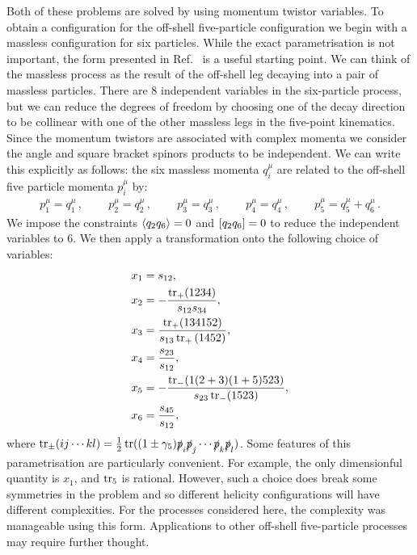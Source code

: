 \documentclass[main.tex]{subfiles}
\begin{document}
Both of these problems are solved by using momentum twistor variables. To obtain a configuration for the off-shell five-particle configuration we begin with a massless configuration for six particles. While the exact parametrisation is not important, the form presented in Ref.~\cite{Badger:2016uuq} is a useful starting point. We can think of the massless process as the result of the off-shell leg decaying into a pair of massless particles. There are 8 independent variables in the six-particle process, but we can reduce the degrees of freedom by choosing one of the decay direction to be collinear with one of the other massless legs in the five-point kinematics. Since the momentum twistors are associated with complex momenta we consider the angle and square bracket spinors products to be independent. We can write this explicitly as follows: the six massless momenta $q_i^\mu$ are related to the off-shell five particle momenta $p_i^\mu$ by:
\begin{align}
  p_1^\mu = q_1^\mu\,, \ \qquad 
  p_2^\mu = q_2^\mu\,, \ \qquad 
  p_3^\mu = q_3^\mu\,, \ \qquad
  p_4^\mu = q_4^\mu \,, \ \qquad
  p_5^\mu = q_5^\mu+q_6^\mu \,.
\end{align}
We impose the constraints $\langle q_2q_6\rangle = 0 $ and $[q_2q_6] = 0$ to reduce the independent variables to 6. 
We then apply a transformation onto the following choice of variables:
\begin{equation}
\begin{aligned}
  x_1 &= s_{12}, \\
  x_2 &= -\frac{\operatorname{\rm tr}_+(1234)}{s_{12}s_{34}}, \\
  x_3 &= \frac{\operatorname{\rm tr}_+(134152)}{s_{13}\operatorname{\rm tr}_+{(1452)}}, \\
  x_4 &= \frac{s_{23}}{s_{12}}, \\
  x_5 &= -\frac{\operatorname{\rm tr}_-(1(2+3)(1+5)523)}{s_{23}\operatorname{\rm tr}_-(1523)}, \\
  x_6 &= \frac{s_{45}}{s_{12}},
\end{aligned}
\label{eq:mtvardefs}
\end{equation}
where $\operatorname{\rm tr}_{\pm}(ij \cdots kl) = \frac{1}{2} \operatorname{\rm tr}((1\pm\gamma_5)\slashed{p}_i\slashed{p}_j \cdots\slashed{p}_k\slashed{p}_l)$.
Some features of this parametrisation are particularly convenient. For example, the only dimensionful 
quantity is $x_1$, and $\operatorname{\rm tr}_5$ is rational. However, such a choice does break some symmetries
in the problem and so different helicity configurations will have different complexities. For the
processes considered here, the complexity was manageable using this form.
Applications to other off-shell five-particle processes may require further thought. 
\end{document}
